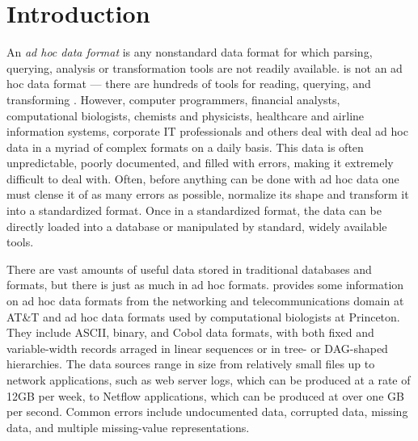 \section{Introduction}
\label{sec:intro}

An {\em ad hoc data format} is any nonstandard data format for which
parsing, querying, analysis or transformation tools are not readily
available.  \xml{} is not an ad hoc data format --- there are hundreds
of tools for reading, querying, and transforming \xml{}.  However,
computer programmers, financial analysts, computational biologists,
chemists and physicists, healthcare and airline information systems,
corporate IT professionals and others deal with deal ad hoc data in a
myriad of complex formats on a daily basis.  This data is often
unpredictable, poorly documented, and filled with errors, making it
extremely difficult to deal with.  Often, before anything can be done
with ad hoc data one must clense it of as many errors as possible,
normalize its shape and transform it into a standardized format.  Once
in a standardized format, the data can be directly loaded into a
database or manipulated by standard, widely available tools.


There are vast amounts of useful data stored in traditional databases
and \xml{} formats, but there is just as much in ad hoc formats.
 provides some information on ad hoc data
formats from the networking and telecommunications domain at AT\&T and
ad hoc data formats used by computational biologists at Princeton.
They include ASCII, binary, and Cobol data formats, with both fixed
and variable-width records arraged in linear sequences or in tree- or
DAG-shaped hierarchies.  The data sources range in size from
relatively small files up to network applications, such as web server
logs, which can be produced at a rate of 12GB per week, to Netflow
applications, which can be produced at over one GB per second.  Common
errors include undocumented data, corrupted data, missing data, and
multiple missing-value representations.


